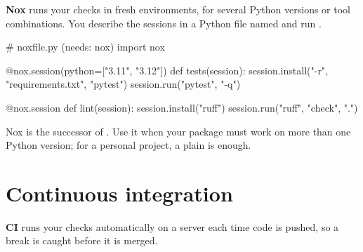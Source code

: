 \textbf{Nox} runs your checks in fresh environments, for several Python versions or tool combinations. You describe the
sessions in a Python file named  and run .

\begin{pycode}
# noxfile.py   (needs: nox)
import nox


@nox.session(python=["3.11", "3.12"])
def tests(session):
    session.install("-r", "requirements.txt", "pytest")
    session.run("pytest", "-q")


@nox.session
def lint(session):
    session.install("ruff")
    session.run("ruff", "check", ".")
\end{pycode}

Nox is the successor of . Use it when your package must work on more than one Python version; for a personal
project, a plain  is enough.

\section{Continuous integration}

\textbf{CI} runs your checks automatically on a server each time code is pushed, so a break is caught
before it is merged.

\begin{center}
\end{center}


